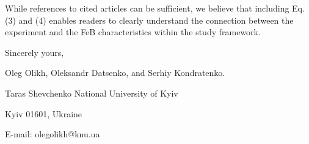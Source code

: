 \documentclass{WileyMSP-template}
\begin{document}
While references to cited articles can be sufficient,
we believe that including Eq.(3) and (4) enables readers to clearly understand
the connection between the experiment and the FeB characteristics within the study framework.





\vspace{1.5cm}

Sincerely yours,

Oleg Olikh, Oleksandr Datsenko, and Serhiy Kondratenko.


Taras Shevchenko National University of Kyiv


Kyiv 01601, Ukraine

E-mail: olegolikh@knu.ua



\end{document}
